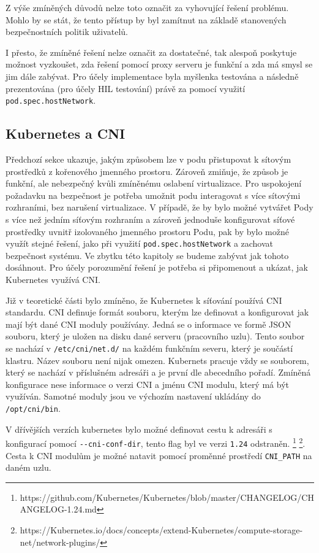 Z výše zmíněných důvodů nelze toto označit za vyhovující řešení problému. Mohlo by se stát, že tento přístup by byl zamítnut na základě stanovených bezpečnostních politik uživatelů.

I přesto, že zmíněné řešení nelze označit za dostatečné, tak alespoň poskytuje možnost vyzkoušet, zda řešení pomocí proxy serveru je funkční a zda má smysl se jim dále zabývat. Pro účely implementace byla myšlenka testována a následně prezentována (pro účely HIL testování) právě za pomocí využití \verb|pod.spec.hostNetwork|.

\subsection{Kubernetes a CNI}
Předchozí sekce ukazuje, jakým způsobem lze v podu přistupovat k sítovým prostředků z kořenového jmenného prostoru. Zároveň zmiňuje, že způsob je funkční, ale nebezpečný kvůli zmíněnému oslabení virtualizace. Pro uspokojení požadavku na bezpečnost je potřeba umožnit podu interagovat s více sítovými rozhraními, bez narušení virtualizace. V případě, že by bylo možné vytvářet Pody s více než jedním síťovým rozhraním a zároveň jednoduše konfigurovat síťové prostředky uvnitř izolovaného jmenného prostoru Podu, pak by bylo možné využít stejné řešení, jako při využití \verb|pod.spec.hostNetwork| a zachovat bezpečnost systému. Ve zbytku této kapitoly se budeme zabývat jak tohoto dosáhnout. Pro účely porozumění řešení je potřeba si připomenout a ukázat, jak Kubernetes využívá CNI.

Již v teoretické části bylo zmíněno, že Kubernetes k síťování používá CNI standardu. CNI definuje formát souboru, kterým lze definovat a konfigurovat jak mají být dané CNI moduly používány. Jedná se o informace ve formě JSON souboru, který je uložen na disku dané serveru (pracovního uzlu). Tento soubor se nachází v \verb|/etc/cni/net.d/| na každém funkčním severu, který je součástí klastru. Název souboru není nijak omezen. Kubernets pracuje vždy se souborem, který se nachází v příslušném adresáři a je první dle abecedního pořadí. Zmíněná konfigurace nese informace o verzi CNI a jménu CNI modulu, který má být využíván. Samotné moduly jsou ve výchozím nastavení ukládány do \verb|/opt/cni/bin|. 

V dřívějších verzích kubernetes bylo možné definovat cestu k adresáři s konfigurací pomocí \verb|--cni-conf-dir|, tento flag byl ve verzi \verb|1.24| odstraněn.
\footnote{https://github.com/Kubernetes/Kubernetes/blob/master/CHANGELOG/CHANGELOG-1.24.md} \footnote{https://Kubernetes.io/docs/concepts/extend-Kubernetes/compute-storage-net/network-plugins/}. Cesta k CNI modulům je možné natavit pomocí proměnné prostředí \verb|CNI_PATH| na daném uzlu.

